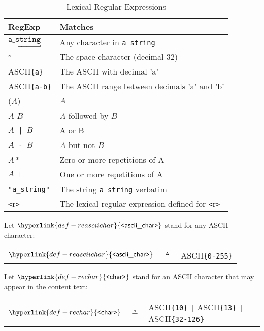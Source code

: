 \documentclass{book}
\newcommand\Char[1]{\underline{#1}}
\newcommand\REasciichar[0]{\hyperlink{def-reasciichar}{\texttt{<}\textsf{ascii\_char}\texttt{>}}}
\newcommand\REchar[0]{\hyperlink{def-rechar}{\texttt{<}\textsf{char}\texttt{>}}}
\newcommand\ascii[1]{\textsf{ASCII}\texttt{\{#1\}}}
\begin{document}
\begin{table}
\caption{Lexical Regular Expressions \label{ta:LexicalRegularExpressions}}
\begin{center}
\begin{tabular}{ll}
\hline
\textbf{RegExp} & \textbf{Matches}\\
\hline
$\underbracket{\texttt{a\_string}}$  & Any character in \texttt{a\_string}\\
$\square$            & The space character (decimal 32)\\
\ascii{a}       & The ASCII with decimal 'a'\\
\ascii{a-b}     & The ASCII range between decimals 'a' and 'b'\\
(\texttt{$A$})          & $A$\\
$A$ $B$                   & $A$ followed by $B$\\
\texttt{$A$ | $B$}        & A or B\\
\texttt{$A$ - $B$}        & $A$ but not $B$\\
$A*$             & Zero or more repetitions of A\\
$A+$             & One or more repetitions of A\\
\texttt{"a\_string"}  & The string \texttt{a\_string} verbatim\\
\texttt{<}r\texttt{>}     & The lexical regular expression defined for \texttt{<}r\texttt{>}\\
\hline
\end{tabular}
\end{center}
\end{table}

Let $\REasciichar$ stand for any ASCII character:
\hypertarget{def-reasciichar}{}
\begin{center}
\begin{tabular}{rcl}
$\REasciichar$  &$\triangleq$& \ascii{0-255}
\end{tabular}
\end{center}

Let $\REchar$ stand for an ASCII character that may appear in the content text:
\hypertarget{def-rechar}{}
\begin{center}
\begin{tabular}{rcl}
$\REchar$       &$\triangleq$& \ascii{10} \texttt{|} \ascii{13} \texttt{|} \ascii{32-126}\\
\end{tabular}
\end{center}
\end{document}

